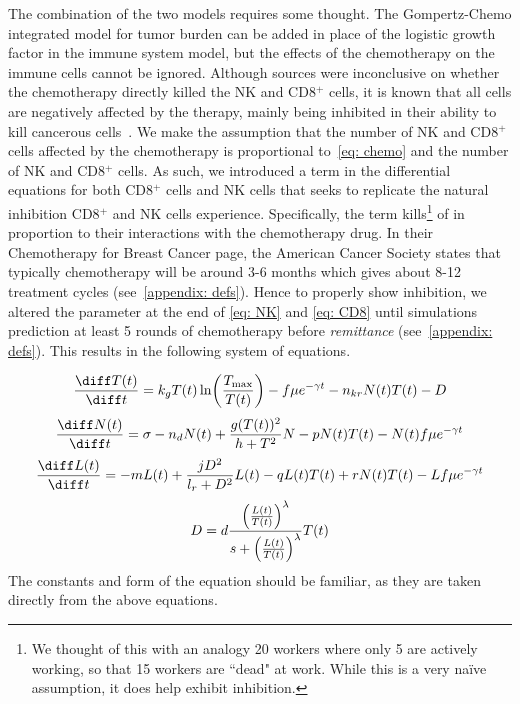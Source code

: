 \documentclass[11pt]{amsart}
\begin{document}
The combination of the two models requires some thought.
The Gompertz-Chemo integrated model for tumor burden can be added in place of the logistic growth factor in the immune system model, but the effects of the chemotherapy on the immune cells cannot be ignored.
Although sources were inconclusive on whether the chemotherapy directly killed the NK and CD8$^+$ cells, it is known that all cells are negatively affected by the therapy, mainly being inhibited in their ability to kill cancerous cells\ \cite{RebeCytoChemonImmune}.
We make the assumption that the number of NK and CD8$^+$ cells affected by the chemotherapy is proportional to\ \eqref{eq: chemo} and the number of NK and CD8$^+$ cells. 
As such, we introduced a term in the differential equations for both CD8$^+$ cells and NK cells that seeks to replicate the natural inhibition CD8$^+$ and NK cells experience.
Specifically, the term kills\footnote{We thought of this with an analogy 20 workers where only 5 are actively working, so that 15 workers are ``dead" at work. While this is a very naïve assumption, it does help exhibit inhibition.} of in proportion to their interactions with the chemotherapy drug.
In their Chemotherapy for Breast Cancer page, the American Cancer Society states that typically chemotherapy will be around 3-6 months which gives about 8-12 treatment cycles (see\ \ref{appendix: defs}).
Hence to properly show inhibition, we altered the parameter at the end of \eqref{eq: NK} and \eqref{eq: CD8} until simulations prediction at least 5 rounds of chemotherapy before \textit{remittance} (see\ \ref{appendix: defs}).
This results in the following system of equations.

\begin{equation} \label{eq:unifiedmodel}
\frac{\diff T(t)}{\diff t} = k_g T(t) \ln \biggl(\frac{T_{\max}}{T(t)} \biggr) - f \mu e^{-\gamma t} - n_{kr}N(t)T(t) - D 
\end{equation}
\begin{equation} \label{eq: NK}
\frac{\diff N(t)}{\diff t} = \sigma - n_dN(t) +\frac{g(T(t))^2}{h + T^2}N - pN(t)T(t) - N(t)f \mu e^{-\gamma t}
\end{equation}
\begin{equation} \label{eq: CD8}
\frac{\diff L(t)}{\diff t} = - mL(t) +\frac{jD^2}{l_r + D^2}L(t) - qL(t)T(t) + rN(t)T(t) - Lf \mu e^{-\gamma t}
\end{equation}
\begin{equation} \label{eq:Dconst}
D = d\frac{\Bigl(\frac{L(t)}{T(t)}\Bigr)^\lambda}{s + \Bigl(\frac{L(t)}{T(t)}\Bigr)^\lambda}T(t)
\end{equation}
The constants and form of the equation should be familiar, as they are taken directly from the above equations. 
\end{document}
